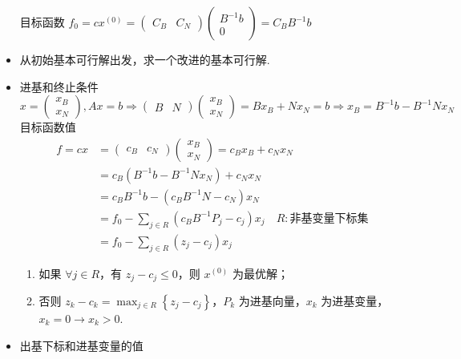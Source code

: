 \begin{remark}
\begin{itemize}
            目标函数 $f_0 = cx^{(0)} = \begin{pmatrix}
                C_B & C_N
            \end{pmatrix} \begin{pmatrix}
                B^{-1}b \\
                0
            \end{pmatrix} = C_BB^{-1}b$
        \item 从初始基本可行解出发，求一个改进的基本可行解.
        \item 进基和终止条件
            \[x=\left(\begin{array}{l}
                x_{B} \\
                x_{N}
                \end{array}\right),A x=b \Rightarrow\begin{pmatrix}
                    B & N
                \end{pmatrix}\left(\begin{array}{l}
                x_{B} \\
                x_{N}
                \end{array}\right)=B x_{B}+N x_{N}=b \Rightarrow x_{B}=B^{-1}b-B^{-1} N x_{N}\]
            目标函数值
            \begin{align*}
                f = cx &= \begin{pmatrix}
                    c_B & c_N
                \end{pmatrix}\begin{pmatrix}
                    x_B \\
                    x_N
                \end{pmatrix} = c_Bx_B + c_Nx_N \\
                &= c_B(B^{-1}b - B^{-1}Nx_N) + c_Nx_N \\
                &= c_BB^{-1}b - (c_BB^{-1}N - c_N)x_N \\
                &= f_0 - \sum_{j\in R}(c_BB^{-1}P_j - c_j)x_j \quad R :\text{非基变量下标集} \\
                &=f_0 - \sum_{j\in R}(z_j - c_j)x_j
            \end{align*}
            \begin{enumerate}
                \item 如果 $\forall j\in R$，有 $z_j - c_j \le 0$，则 $x^{(0)}$ 为最优解；
                \item 否则 $z_k - c_k = \max_{j \in R}\left\{z_j - c_j\right\}$，$P_k$ 为进基向量，$x_k$ 为进基变量，$x_k = 0 \to x_k > 0$.
            \end{enumerate}
        \item 出基下标和进基变量的值
        

\end{itemize}
\end{remark}
